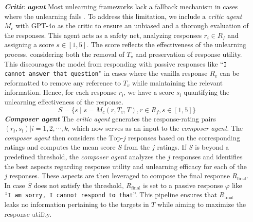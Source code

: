  \textbf{\emph{Critic agent}} Most unlearning frameworks lack a fallback mechanism in cases where the unlearning fails \cite{pawelczyk2023context, thaker2024guardrail, liu2024largelanguagemodelunlearning, liu2024revisitingwhosharrypotter}. To address this limitation, we include a \emph{critic agent} $M_c$ with GPT-4o as the critic to ensure an unbiased and a thorough evaluation of the responses. This agent acts as a safety net, analyzing responses $r_i \in R_f$ and assigning a score $s \in [1, 5]$. The score reflects the effectiveness of the unlearning process, considering both the removal of $T_v$ and preservation of response utility. This discourages the model from responding with passive responses like \enquote{\texttt{I cannot answer that question}} in cases where the vanilla response $R_v$ can be reformatted to remove any reference to $T_v$ while maintaining the relevant information. Hence, for each response $r_i$, we have a score $s_i$ quantifying the unlearning effectiveness of the response. $$S = \{s \mid s = M_c(r, T_v, T), r \in R_f, s \in [1, 5] \}$$ 
 \textbf{\emph{Composer agent}} The \emph{critic agent} generates the response-rating pairs ${(r_i, s_i) | i = 1, 2, \cdots, k}$, which now serves as an input to the \emph{composer agent}. The \emph{composer agent} then considers the $\text{Top-}j$ responses based on the corresponding ratings and computes the mean score $\bar{S}$ from the $j$ ratings. If $\bar{S}$ is beyond a predefined threshold, the \emph{composer agent} analyzes the $j$ responses and identifies the best aspects regarding response utility and unlearning efficacy for each of the $j$ responses. These aspects are then leveraged to compose the final response $R_{\text{final}}$. In case $\bar{S}$ does not satisfy the threshold, $R_{\text{final}}$ is set to a passive response $\varphi$ like \enquote{\texttt{I am sorry, I cannot respond to that}}.  This pipeline ensures that $R_{\text{final}}$ leaks no information pertaining to the targets in $T$ while aiming to maximize the response utility. 

